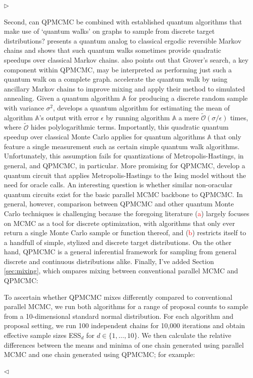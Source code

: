 \documentclass[12pt]{article}
\newenvironment{reply}{$\triangleright$\bfseries}{$\triangleleft$}
\renewenvironment{quote}
               {\list{}{\rightmargin\leftmargin}%
                \item\relax\normalfont}
               {\endlist}
\begin{document}
\begin{reply}
\begin{quote}
Second, can QPMCMC be combined with established quantum algorithms that make use of `quantum walks' on graphs to sample from discrete target distributions?  \citet{szegedy2004quantum} presents a quantum analog to classical ergodic reversible Markov chains and shows that such quantum walks sometimes provide quadratic speedups over classical Markov chains.  \citet{szegedy2004quantum} also points out that Grover's search, a key component within QPMCMC, may be interpreted as performing just such a quantum walk on a complete graph.  \citet{wocjan2008speedup} accelerate the quantum walk by using ancillary Markov chains to improve mixing and apply their method to simulated annealing.  Given a quantum algorithm $\mathbb{A}$ for producing a discrete random sample with variance $\sigma^2$, \citet{montanaro} develops a quantum algorithm for estimating the mean of algorithm $\mathbb{A}$'s output with error $\epsilon$ by running algorithm $\mathbb{A}$ a mere $\widetilde{\mathcal{O}}(\sigma/\epsilon)$ times, where $\widetilde{\mathcal{O}}$ hides polylogarithmic terms. Importantly, this quadratic quantum speedup over classical Monte Carlo applies for quantum algorithms $\mathbb{A}$ that only feature a single measurement such as certain simple quantum walk algorithms. Unfortunately, this assumption fails for quantizations of Metropolis-Hastings, in general, and QPMCMC, in particular. More promising for QPMCMC, \citet{lemieux2020efficient} develop a quantum circuit that applies Metropolis-Hastings to the Ising model without the need for oracle calls.  An interesting question is whether similar non-oracular quantum circuits exist for the basic parallel MCMC backbone to QPMCMC.  In general, however, comparison between QPMCMC and other quantum Monte Carlo techniques is challenging because the foregoing literature (\textcolor{red}{a}) largely focuses on MCMC as a tool for discrete optimization, with algorithms that only ever return a single Monte Carlo sample or function thereof, and (\textcolor{red}{b}) restricts itself to a handfull of simple, stylized and discrete target distributions.  On the other hand, QPMCMC is a general inferential framework for sampling from general discrete and continuous distributions alike.
	\end{quote}
Finally, I've added Section \ref{sec:mixing}, which ompares mixing between conventional parallel MCMC and QPMCMC:
\begin{quote}
	To ascertain whether QPMCMC mixes differently compared to conventional parallel MCMC, we run both algorithms for a range of proposal counts to sample from a 10-dimensional standard normal distribution. For each algorithm and proposal setting, we run 100 independent chains for 10,000 iterations and obtain effective sample sizes ESS$_d$ for $d \in \{1,\dots,10\}$.   We then calculate the relative differences between the means and minima of one chain generated using parallel MCMC and one chain generated using QPMCMC; for example:

\end{quote}
\end{reply}
\end{document}
